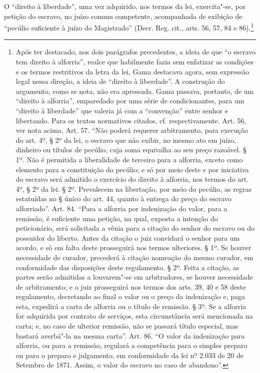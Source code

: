 O ``direito à liberdade'', uma vez adquirido, nos termos da lei,
exercita"-se, por petição do escravo, no juízo comum competente,
acompanhada de exibição de ``pecúlio suficiente à juízo do Magistrado''
(Decr. Reg. cit., arts. 56, 57, 84 e 86).\footnote{Após ter destacado,
  nos dois parágrafos precedentes, a ideia de que ``o escravo tem direito
  à alforria'', realce que habilmente fazia sem enfatizar as condições e
  os termos restritivos da letra da lei, Gama destacava agora, sem
  expressão legal nessa direção, a ideia de ``direito à liberdade''. A
  construção do argumento, como se nota, não era apressada. Gama
  passava, portanto, de um ``direito à alforria'', emparedado por uma série
  de condicionantes, para um ``direito à liberdade'' que valeria já com a
  ``convenção'' entre senhor e libertando. Para os textos normativos
  citados, cf. respectivamente. Art. 56, ver nota acima. Art. 57. ``Não
  poderá requerer arbitramento, para execução do art. 4º, § 2º da lei, o
  escravo que não exibir, no mesmo ato em juízo, dinheiro ou títulos de
  pecúlio, cuja soma equivalha ao seu preço razoável. § 1º. Não é
  permitida a liberalidade de terceiro para a alforria, exceto como
  elemento para a constituição do pecúlio; e só por meio deste e por
  iniciativa do escravo será admitido o exercício do direito à alforria,
  nos termos do art. 4º, § 2º da lei. § 2º. Prevalecem na libertação,
  por meio do pecúlio, as regras estatuídas no § único do art. 44,
  quanto à entrega do preço do escravo alforriado''. Art. 84. ``Para a
  alforria por indenização do valor, para a remissão, é suficiente uma
  petição, na qual, exposta a intenção do peticionário, será solicitada
  a vênia para a citação do senhor do escravo ou do possuidor do
  liberto. Antes da citação o juiz convidará o senhor para um acordo, e
  só em falta deste prosseguirá nos termos ulteriores. § 1º. Se houver
  necessidade de curador, precederá à citação nomeação do mesmo curador,
  em conformidade das disposições deste regulamento. § 2º. Feita a
  citação, as partes serão admitidas a louvarem"-se em arbitradores, se
  houver necessidade de arbitramento; e o juiz prosseguirá nos termos
  dos arts. 39, 40 e 58 deste regulamento, decretando ao final o valor
  ou o preço da indenização e, paga esta, expedirá a carta de alforria
  ou o título de remissão. § 3º. Se a alforria for adquirida por
  contrato de serviços, esta circunstância será mencionada na carta; e,
  no caso de ulterior remissão, não se passará título especial, mas
  bastará averbá"-la na mesma carta''. Art. 86. ``O valor da indenização para
  alforria, ou para a remissão, regulará a competência para o simples
  preparo ou para o preparo e julgamento, em conformidade da lei nº
  2.033 de 20 de Setembro de 1871. Assim, o valor do escravo no caso de
  abandono''.}

